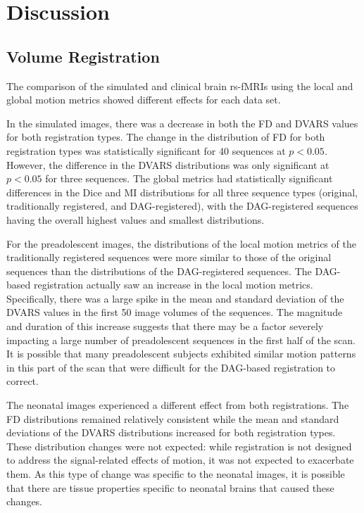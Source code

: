 \chapter{Discussion}
\label{ch:discussion}

\section{Volume Registration}

The comparison of the simulated and clinical brain rs-fMRIs using the local and global motion metrics showed different effects for each data set.

In the simulated images, there was a decrease in both the FD and DVARS values for both registration types. The change in the distribution of FD for both registration types was statistically significant for 40 sequences at $p < 0.05$. However, the difference in the DVARS distributions was only significant at $p < 0.05$ for three sequences. The global metrics had statistically significant differences in the Dice and MI distributions for all three sequence types (original, traditionally registered, and DAG-registered), with the DAG-registered sequences having the overall highest values and smallest distributions.

For the preadolescent images, the distributions of the local motion metrics of the traditionally registered sequences were more similar to those of the original sequences than the distributions of the DAG-registered sequences. The DAG-based registration actually saw an increase in the local motion metrics. Specifically, there was a large spike in the mean and standard deviation of the DVARS values in the first 50 image volumes of the sequences. The magnitude and duration of this increase suggests that there may be a factor severely impacting a large number of preadolescent sequences in the first half of the scan. It is possible that many preadolescent subjects exhibited similar motion patterns in this part of the scan that were difficult for the DAG-based registration to correct.

The neonatal images experienced a different effect from both registrations. The FD distributions remained relatively consistent while the mean and standard deviations of the DVARS distributions increased for both registration types. These distribution changes were not expected: while registration is not designed to address the signal-related effects of motion, it was not expected to exacerbate them. As this type of change was specific to the neonatal images, it is possible that there are tissue properties specific to neonatal brains that caused these changes.


